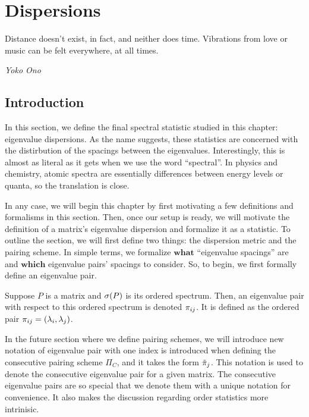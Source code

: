 
\chapter{Dispersions}

\epigraph{Distance doesn't exist, in fact, and neither does time. Vibrations from love or music can be felt everywhere, at all times.}{\textit{Yoko Ono}}

\section{Introduction}

In this section, we define the final spectral statistic studied in this chapter: eigenvalue dispersions.
As the name suggests, these statistics are concerned with the distirbution of the spacings between the eigenvalues.
Interestingly, this is almost as literal as it gets when we use the word ``spectral''.
In physics and chemistry, atomic spectra are essentially differences between energy levels or quanta, so the translation is close.

In any case, we will begin this chapter by first motivating a few definitions and formalisms in this section.
Then, once our setup is ready, we will motivate the definition of a matrix's eigenvalue dispersion and formalize it as a statistic.
To outline the section, we will first define two things: the dispersion metric and the pairing scheme.
In simple terms, we formalize $\textbf{what}$ ``eigenvalue spacings'' are and $\textbf{which}$ eigenvalue pairs' spacings to consider.
So, to begin, we first formally define an eigenvalue pair.

\begin{definition}
  Suppose $P$ is a matrix and $\sigma(P)$ is its ordered spectrum. Then, an eigenvalue pair with respect to this ordered spectrum is denoted ${\pi_{ij}}$.
  It is defined as the ordered pair ${\pi_{ij}} = (\lambda_i, \lambda_j)$.
\end{definition}


In the future section where we define pairing schemes, we will introduce new notation of eigenvalue pair with one index is introduced when defining the consecutive pairing scheme $\Pi_C$, and it takes the form ${\tilde{\pi}}_j$.
This notation is used to denote the consecutive eigenvalue pair for a given matrix.
The consecutive eigenvalue pairs are so special that we denote them with a unique notation for convenience. It also makes the discussion regarding order statistics more intrinisic.

